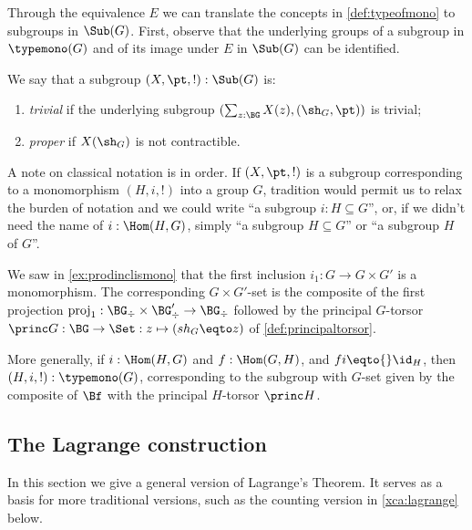 Through the equivalence $E$ we can translate the concepts in
\cref{def:typeofmono} to subgroups in $\Sub(G)$. 
First, observe that the underlying groups of a subgroup in $\typemono(G)$
and of its image under $E$ in $\Sub(G)$ can be identified.

\begin{definition}\label{def:triv-proper-Mono}
We say that a subgroup $(X,\pt,!):\Sub(G)$ is:
      \begin{enumerate}
      \item \emph{trivial} if the underlying subgroup
      $(\sum_{z:\BG}X(z),(\sh_G,\pt))$ is trivial;
      \item \emph{proper} if $X(\sh_G)$ is not
      contractible.\qedhere
      \end{enumerate}
\end{definition}
      
\begin{remark}\label{rem:notationsubgroup}
      A note on classical notation is in order.
If $(X,\pt,!)$ is a subgroup corresponding to a monomorphism $(H,i,!)$ into a group $G$, tradition would permit us to relax the burden of notation and we could write ``a subgroup $i:H\subseteq G$'', or, if we didn't need the name of $i:\Hom(H,G)$, simply ``a subgroup $H\subseteq G$'' or ``a subgroup $H$ of $G$''.
    \end{remark}
    
\begin{example}
  \label{ex:prodinclisGset}
  We saw in \cref{ex:prodinclismono} that the first 
  inclusion $i_1:G\to G\times G'$ is a monomorphism.
  The corresponding $G\times G'$-set is the composite of the first projection
  $\mathrm{proj}_1:\BG_\div\times\BG'_\div\to \BG_\div$ followed by the
  principal $G$-torsor $\princ G:\BG\to\Set: z\mapsto (sh_G\eqto z)$ 
  of \cref{def:principaltorsor}.

  More generally, if $i:\Hom(H,G)$ and $f:\Hom(G,H)$, and $fi\eqto{}\id_H$,
  then $(H,i,!):\typemono(G)$, corresponding to the subgroup with $G$-set 
  given by the composite of $\Bf$ with the principal $H$-torsor $\princ H$.
\end{example}
    
    
\subsection{The Lagrange construction}

In this section we give a general version of Lagrange's Theorem.
It serves as a basis for more traditional versions, such as the
counting version in \cref{xca:lagrange} below.

